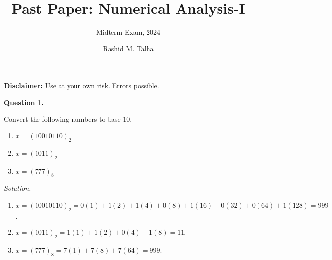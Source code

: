 \documentclass[11pt]{penrose}
\title{Past Paper: Numerical Analysis-I}
\subtitle{Midterm Exam, 2024}
\author{Rashid M. Talha}
\begin{document}
\newenvironment{problem}[2][Question]{\textbf{#1 #2.}\par}{}
\newcommand{\solution}{\textit{Solution.}\hspace{2mm}}

\maketitle

\textbf{Disclaimer:} Use at your own risk. Errors possible.

\begin{problem}{1}
    Convert the following numbers to base $10$.
    \begin{enumerate}[label=(\alph*)]
        \item $x = (10 010 110)_2$
        \item $x = (1 011)_2$
        \item $x = (777)_8$
    \end{enumerate}

    \solution \phantom{}
    \begin{enumerate}[label=(\alph*)]
        \item $x = (10 010 110)_2 = 0(1) + 1(2) + 1(4) + 0(8) + 1(16) + 0(32) + 0(64) + 1(128) = 999$.
        \item $x = (1 011)_2 = 1(1) + 1(2) + 0(4) + 1(8) = 11$.
        \item $x = (777)_8 = 7(1) + 7(8) + 7(64) = 999$.
    \end{enumerate}
\end{problem}
\end{document}
